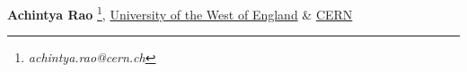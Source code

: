 \textbf{Achintya Rao} \footnote{\textit{achintya.rao@cern.ch}}, \href{http://uwe.ac.uk}{University of the West of England} \& \href{http://cern.ch}{CERN}\\
